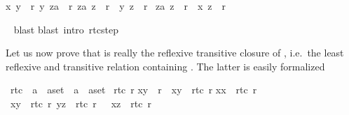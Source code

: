 \begin{isabellebody}
\begin{isamarkuptxt}
\begin{isabelle}
x{\isacharcomma}\ y{\isacharparenright}\ {\isasymin}\ r{\isacharsemicolon}\ {\isacharparenleft}y{\isacharcomma}\ za{\isacharparenright}\ {\isasymin}\ r{\isacharasterisk}{\isacharsemicolon}\ {\isacharparenleft}za{\isacharcomma}\ z{\isacharparenright}\ {\isasymin}\ r{\isacharasterisk}\ {\isasymlongrightarrow}\ {\isacharparenleft}y{\isacharcomma}\ z{\isacharparenright}\ {\isasymin}\ r{\isacharasterisk}{\isasymrbrakk}\isanewline
{}\ {\isacharparenleft}za{\isacharcomma}\ z{\isacharparenright}\ {\isasymin}\ r{\isacharasterisk}\ {\isasymlongrightarrow}\ {\isacharparenleft}x{\isacharcomma}\ z{\isacharparenright}\ {\isasymin}\ r{\isacharasterisk}%
\end{isabelle}%
\end{isamarkuptxt}%
\ \isamarkuptrue%
blast{\isacharparenright}\isanewline
\isamarkupfalse%
blast\ intro{\isacharcolon}\ rtc{\isacharunderscore}step{\isacharparenright}\isanewline
\isamarkupfalse%
\isamarkupfalse%
%
\begin{isamarkuptext}%
Let us now prove that  is really the reflexive transitive closure
of , i.e.\ the least reflexive and transitive
relation containing . The latter is easily formalized%
\end{isamarkuptext}%
\isamarkuptrue%
\ rtc{}\ {\isacharcolon}{\isacharcolon}\ {\isachardoublequote}{\isacharparenleft}{\isacharprime}a\ {\isasymtimes}\ {\isacharprime}a{\isacharparenright}set\ {\isasymRightarrow}\ {\isacharparenleft}{\isacharprime}a\ {\isasymtimes}\ {\isacharprime}a{\isacharparenright}set{\isachardoublequote}\isanewline
\isamarkupfalse%
\ {\isachardoublequote}rtc{}\ r{\isachardoublequote}\isanewline
{}\isanewline
{\isachardoublequote}{\isacharparenleft}x{\isacharcomma}y{\isacharparenright}\ {\isasymin}\ r\ {\isasymLongrightarrow}\ {\isacharparenleft}x{\isacharcomma}y{\isacharparenright}\ {\isasymin}\ rtc{}\ r{\isachardoublequote}\isanewline
{\isachardoublequote}{\isacharparenleft}x{\isacharcomma}x{\isacharparenright}\ {\isasymin}\ rtc{}\ r{\isachardoublequote}\isanewline
{\isachardoublequote}{\isasymlbrakk}\ {\isacharparenleft}x{\isacharcomma}y{\isacharparenright}\ {\isasymin}\ rtc{}\ r{\isacharsemicolon}\ {\isacharparenleft}y{\isacharcomma}z{\isacharparenright}\ {\isasymin}\ rtc{}\ r\ {\isasymrbrakk}\ {\isasymLongrightarrow}\ {\isacharparenleft}x{\isacharcomma}z{\isacharparenright}\ {\isasymin}\ rtc{}\ r{\isachardoublequote}\isamarkupfalse%

\end{isabellebody}
